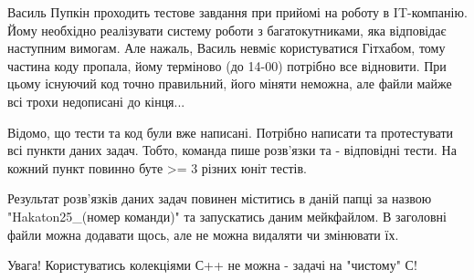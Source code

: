 \documentclass[]{article}
\date{}
\begin{document}
Василь Пупкін проходить тестове завдання при прийомі на роботу в IT-компанію. 
Йому необхідно реалізувати систему роботи з багатокутниками, яка відповідає наступним вимогам.
Але нажаль, Василь невміє користуватися Гітхабом, тому частина коду пропала, йому терміново (до 14-00)
потрібно все відновити.
При цьому існуючий код точно правильний, його міняти неможна, але файли майже всі трохи недописані до кінця...

Відомо, що тести та код були вже написані. Потрібно написати та протестувати всі пункти даних задач. 
Тобто, команда пише розв'язки та - відповідні тести.
На кожний пункт повинно буте >= 3 різних юніт тестів.   

Результат розв'язків даних задач повинен міститись в даній папці за назвою "Hakaton25_(номер команди)"
та запускатись даним мейкфайлом.
В заголовні файли можна додавати щось, але не можна видаляти чи змінювати їх.

Увага! Користуватись колекціями С++ не можна - задачі на "чистому" С!
\end{document}
